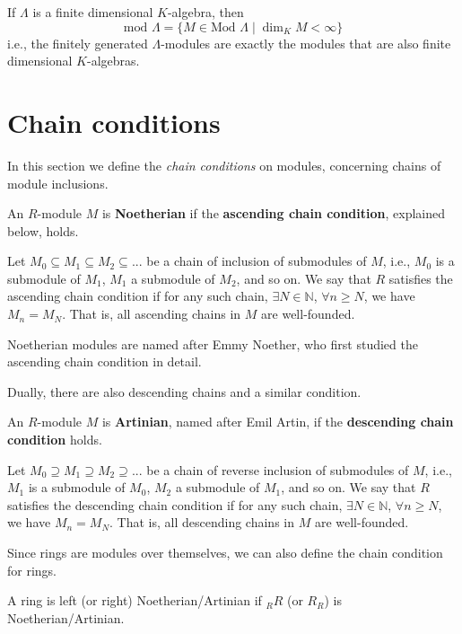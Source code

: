 \documentclass[12pt, a4paper, titlepage]{report}
\begin{document}
\begin{rem}
  If $\Lambda$ is a finite dimensional $K$-algebra, then
  \[
    \text{mod } \Lambda = \{ M \in \text{Mod } \Lambda \mid \dim_K M < \infty \}
  \]
  i.e., the finitely generated $\Lambda$-modules are exactly the modules that are also finite dimensional $K$-algebras.
\end{rem}

\section{Chain conditions}
In this section we define the \textit{chain conditions} on modules, concerning chains of module inclusions.

\begin{defn}
  An $R$-module $M$ is \textbf{Noetherian} if the \textbf{ascending chain condition}, explained below, holds.

  Let $M_0 \subseteq M_1 \subseteq M_2 \subseteq ...$ be a chain of inclusion of submodules of $M$, i.e., $M_0$ is a submodule of $M_1$,
  $M_1$ a submodule of $M_2$, and so on. We say that $R$ satisfies the ascending chain condition if for any such chain,
  $\exists N \in \mathbb{N}$, $\forall n \geq N$, we have $M_n = M_N$. That is, all ascending chains in $M$ are well-founded.

  Noetherian modules are named after Emmy Noether, who first studied the ascending chain condition in detail.
\end{defn}

Dually, there are also descending chains and a similar condition.

\begin{defn}
  An $R$-module $M$ is \textbf{Artinian}, named after Emil Artin, if the \textbf{descending chain condition} holds.

  Let $M_0 \supseteq M_1 \supseteq M_2 \supseteq ...$ be a chain of reverse inclusion of submodules of $M$, i.e., $M_1$ is a submodule of $M_0$,
  $M_2$ a submodule of $M_1$, and so on. We say that $R$ satisfies the descending chain condition if for any such chain,
  $\exists N \in \mathbb{N}$, $\forall n \geq N$, we have $M_n = M_N$. That is, all descending chains in $M$ are well-founded.
\end{defn}

Since rings are modules over themselves, we can also define the chain condition for rings.

\begin{defn}
  A ring is left (or right) Noetherian/Artinian if ${}_R R$ (or $R_R$) is Noetherian/Artinian.
\end{defn}
\end{document}
